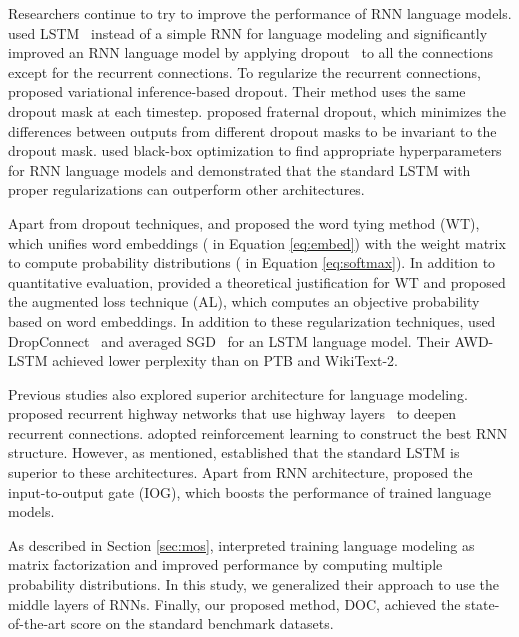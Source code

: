 \documentclass[11pt,a4paper]{article}
\begin{document}
Researchers continue to try to improve the performance of RNN language models.
 used LSTM~\cite{Hochreiter:1997:LSM:1246443.1246450} instead of a simple RNN for language modeling and significantly improved an RNN language model by applying dropout~\cite{Srivastava:2014:DSW:2627435.2670313} to all the connections except for the recurrent connections.
To regularize the recurrent connections,  proposed variational inference-based dropout.
Their method uses the same dropout mask at each timestep.
 proposed fraternal dropout, which minimizes the differences between outputs from different dropout masks to be invariant to the dropout mask.
 used black-box optimization to find appropriate hyperparameters for RNN language models and demonstrated that the standard LSTM with proper regularizations can outperform other architectures.



Apart from dropout techniques,  and  proposed the word tying method (WT), which unifies word embeddings ( in Equation \ref{eq:embed}) with the weight matrix to compute probability distributions ( in Equation \ref{eq:softmax}).
In addition to quantitative evaluation,  provided a theoretical justification for WT and proposed the augmented loss technique (AL), which computes an objective probability based on word embeddings.
In addition to these regularization techniques,  used DropConnect~\cite{wan2013regularization} and averaged SGD~\cite{polyak1992acceleration} for an LSTM language model.
Their AWD-LSTM achieved lower perplexity than  on PTB and WikiText-2.


Previous studies also explored superior architecture for language modeling.
 proposed recurrent highway networks that use highway layers~\cite{DBLP:journals/corr/SrivastavaGS15} to deepen recurrent connections.
 adopted reinforcement learning to construct the best RNN structure.
However, as mentioned,  established that the standard LSTM is superior to these architectures.
Apart from RNN architecture,  proposed the input-to-output gate (IOG), which boosts the performance of trained language models.


As described in Section \ref{sec:mos},  interpreted training language modeling as matrix factorization and improved performance by computing multiple probability distributions.
In this study, we generalized their approach to use the middle layers of RNNs.
Finally, our proposed method, DOC, achieved the state-of-the-art score on the standard benchmark datasets.
\end{document}

